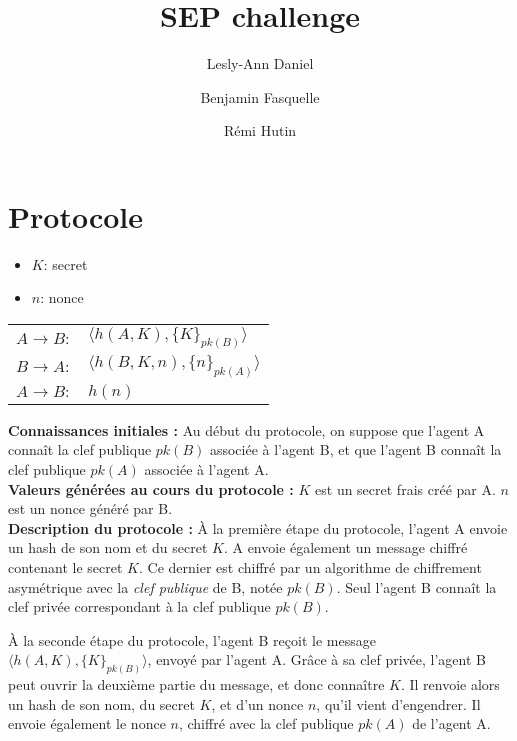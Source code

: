 \documentclass[10pt,a4paper]{article}
\author{Lesly-Ann Daniel \and Benjamin Fasquelle \and Rémi Hutin}
\title{SEP challenge}
\begin{document}
\maketitle


\section{Protocole}

\begin{itemize}
\item $K$: secret
\item $n$: nonce
\end{itemize}

\begin{table}[!h]
\centering
\begin{tabular}{ll}
$A \rightarrow B:$ & $\langle h(A, K), \{K\}_{pk(B)} \rangle $ \\
$B \rightarrow A:$ & $\langle h(B, K, n), \{n\}_{pk(A)} \rangle $\\
$A \rightarrow B:$ & $h(n)$\\
\end{tabular}
\end{table}

\textbf{Connaissances initiales :} 
Au début du protocole, on suppose que l'agent A connaît la clef publique $pk(B)$ associée à l'agent B,
et que l'agent B connaît la clef publique $pk(A)$ associée à l'agent A. \\

\textbf{Valeurs générées au cours du protocole :} 
$K$ est un secret frais créé par A.
$n$ est un nonce généré par B.\\

\textbf{Description du protocole :}
À la première étape du protocole, l'agent A envoie un hash de son nom et du secret $K$. 
A envoie également un message chiffré contenant le secret $K$. 
Ce dernier est chiffré par un algorithme de chiffrement asymétrique avec la \emph{clef publique} de B, notée $pk(B)$.
Seul l'agent B connaît la clef privée correspondant à la clef publique $pk(B)$. 

À la seconde étape du protocole, l'agent B reçoit le message $\langle h(A, K), \{K\}_{pk(B)} \rangle $, envoyé par l'agent A.
Grâce à sa clef privée, l'agent B peut ouvrir la deuxième partie du message, et donc connaître $K$.
Il renvoie alors un hash de son nom, du secret $K$, et d'un nonce $n$, qu'il vient d'engendrer.
Il envoie également le nonce $n$, chiffré avec la clef publique $pk(A)$ de l'agent A.
\end{document}
